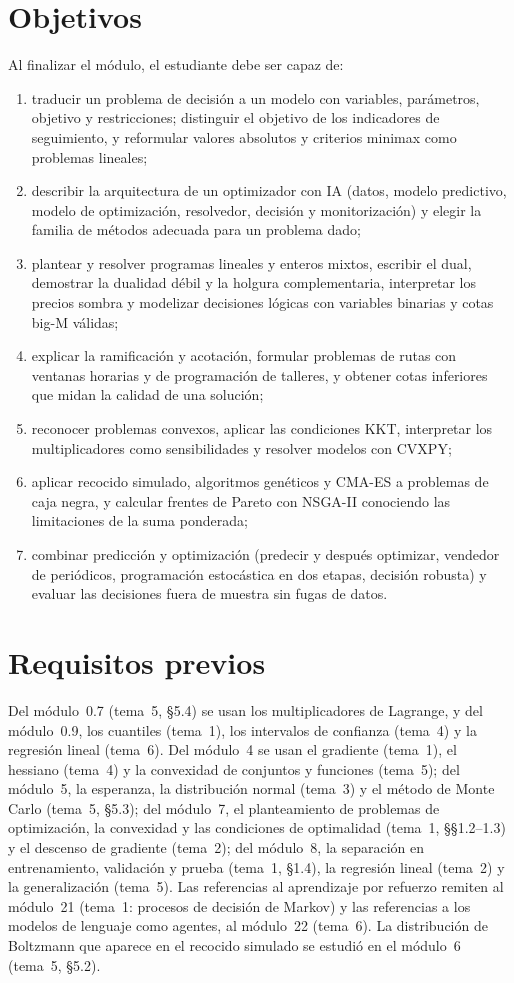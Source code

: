 \documentclass[11pt,a4paper,twoside,openany]{book}
\begin{document}
\section*{Objetivos}
Al finalizar el módulo, el estudiante debe ser capaz de:
\begin{enumerate}[label=\arabic*.]
  \item traducir un problema de decisión a un modelo con variables, parámetros, objetivo y restricciones; distinguir el objetivo de los indicadores de seguimiento, y reformular valores absolutos y criterios minimax como problemas lineales;
  \item describir la arquitectura de un optimizador con IA (datos, modelo predictivo, modelo de optimización, resolvedor, decisión y monitorización) y elegir la familia de métodos adecuada para un problema dado;
  \item plantear y resolver programas lineales y enteros mixtos, escribir el dual, demostrar la dualidad débil y la holgura complementaria, interpretar los precios sombra y modelizar decisiones lógicas con variables binarias y cotas big-M válidas;
  \item explicar la ramificación y acotación, formular problemas de rutas con ventanas horarias y de programación de talleres, y obtener cotas inferiores que midan la calidad de una solución;
  \item reconocer problemas convexos, aplicar las condiciones KKT, interpretar los multiplicadores como sensibilidades y resolver modelos con CVXPY;
  \item aplicar recocido simulado, algoritmos genéticos y CMA-ES a problemas de caja negra, y calcular frentes de Pareto con NSGA-II conociendo las limitaciones de la suma ponderada;
  \item combinar predicción y optimización (predecir y después optimizar, vendedor de periódicos, programación estocástica en dos etapas, decisión robusta) y evaluar las decisiones fuera de muestra sin fugas de datos.
\end{enumerate}

\section*{Requisitos previos}
Del módulo~0.7 (tema~5, §5.4) se usan los multiplicadores de Lagrange, y del módulo~0.9, los cuantiles (tema~1), los intervalos de confianza (tema~4) y la regresión lineal (tema~6). Del módulo~4 se usan el gradiente (tema~1), el hessiano (tema~4) y la convexidad de conjuntos y funciones (tema~5); del módulo~5, la esperanza, la distribución normal (tema~3) y el método de Monte Carlo (tema~5, §5.3); del módulo~7, el planteamiento de problemas de optimización, la convexidad y las condiciones de optimalidad (tema~1, §§1.2--1.3) y el descenso de gradiente (tema~2); del módulo~8, la separación en entrenamiento, validación y prueba (tema~1, §1.4), la regresión lineal (tema~2) y la generalización (tema~5). Las referencias al aprendizaje por refuerzo remiten al módulo~21 (tema~1: procesos de decisión de Markov) y las referencias a los modelos de lenguaje como agentes, al módulo~22 (tema~6). La distribución de Boltzmann que aparece en el recocido simulado se estudió en el módulo~6 (tema~5, §5.2).
\end{document}
